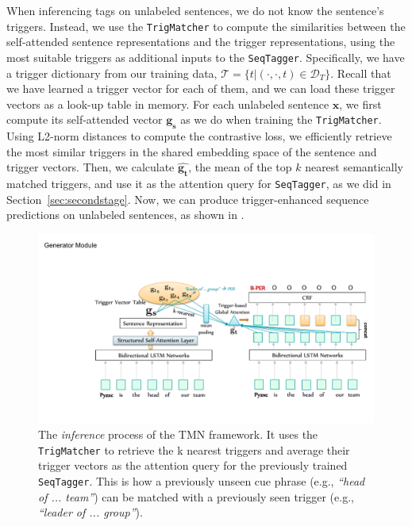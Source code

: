 When inferencing tags on unlabeled sentences,
we do not know the sentence's triggers.
Instead, we use the \texttt{TrigMatcher} to compute the similarities between the self-attended sentence representations and the trigger representations, using the most suitable triggers as additional inputs to the \texttt{SeqTagger}.
Specifically, we have a trigger dictionary from our training data, $\mathcal{T}=\{t | (\cdot, \cdot, t) \in \mathcal{D}_T\}$.
Recall that we have learned a trigger vector for each of them, and we can load these trigger vectors as a look-up table in memory.
For each unlabeled sentence $\mathbf{x}$, we first compute its self-attended vector $\mathbf{g_s}$ as we do when training the \texttt{TrigMatcher}.
Using L2-norm distances to compute the contrastive loss, we efficiently retrieve the most similar triggers in the shared embedding space of the sentence and trigger vectors.
Then, we calculate $\hat{\mathbf{g_t}}$, the mean of the top $k$ nearest semantically matched triggers, and use it as the attention query for \texttt{SeqTagger}, as we did in Section~\ref{sec:secondstage}.
Now, we can produce trigger-enhanced sequence predictions on unlabeled sentences, as shown in .

\begin{figure}[h]
 	\centering 
	\includegraphics[width=0.85\linewidth]{LatexDiss/figures/inference.pdf}
	\caption{The \textit{inference} process of the TMN framework. It uses the \texttt{TrigMatcher} to retrieve the k nearest triggers and average their trigger vectors as the attention query for the previously trained \texttt{SeqTagger}. This is how a previously unseen cue phrase (e.g., \textit{``head of ... team''}) can be matched with a previously seen trigger (e.g., \textit{``leader of ... group''}).} 
	\label{fig:inference}
\end{figure}




